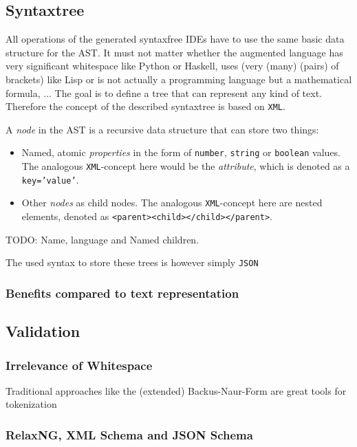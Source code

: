 \subsection{Syntaxtree}

All operations of the generated syntaxfree IDEs have to use the same basic data structure for the AST. It must not matter whether the augmented language has very significant whitespace like Python or Haskell, uses (very (many) (pairs) of brackets) like Lisp or is not actually a programming language but a mathematical formula, ... The goal is to define a tree that can represent any kind of text. Therefore the concept of the described syntaxtree is based on \texttt{XML}\cite{xml_spec}.

A \textit{node} in the AST is a recursive data structure that can store two things:

\begin{itemize}
\item Named, atomic \textit{properties} in the form of \texttt{number}, \texttt{string} or \texttt{boolean} values. The analogous \texttt{XML}-concept here would be the \textit{attribute}, which is denoted as a \texttt{key='value'}.
\item Other \textit{nodes} as child nodes. The analogous \texttt{XML}-concept here are nested elements, denoted as \texttt{<parent><child></child></parent>}.
\end{itemize}

TODO: Name, language and Named children.

The used syntax to store these trees is however simply \texttt{JSON}

\subsubsection{Benefits compared to text representation}

\subsection{Validation}

\subsubsection{Irrelevance of Whitespace}

Traditional approaches like the (extended) Backus-Naur-Form \cite{knuth_backus_1964} are great tools for tokenization

\subsubsection{RelaxNG, XML Schema and JSON Schema}

